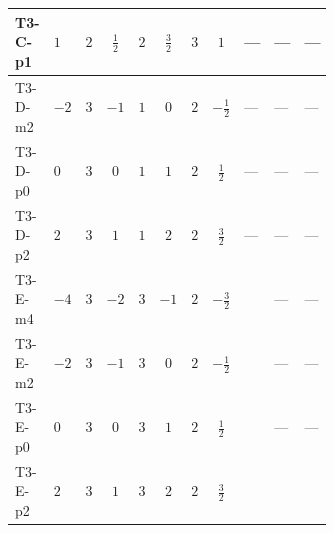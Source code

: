 \documentclass[8pt]{article}
\begin{document}
\begin{landscape}
\begin{longtable}{@{}llcccccc >{\raggedright\arraybackslash}p{0.21\linewidth} >{\raggedright\arraybackslash}p{0.21\linewidth} >{\raggedright\arraybackslash}p{0.21\linewidth}@{}}
\midrule
T3-C-p1 & $1$ & $2$ & $\frac{1}{2}$ & $2$ & $\frac{3}{2}$ & $3$ & $1$ & --- & --- & --- \\
\midrule
T3-D-m2 & $-2$ & $3$ & $-1$ & $1$ & $0$ & $2$ & $-\frac{1}{2}$ & --- & --- & --- \\
\midrule
T3-D-p0 & $0$ & $3$ & $0$ & $1$ & $1$ & $2$ & $\frac{1}{2}$ & --- & --- & --- \\
\midrule
T3-D-p2 & $2$ & $3$ & $1$ & $1$ & $2$ & $2$ & $\frac{3}{2}$ & --- & --- & --- \\
\midrule
T3-E-m4 & $-4$ & $3$ & $-2$ & $3$ & $-1$ & $2$ & $-\frac{3}{2}$ & \scriptsize\adjustbox{max width=\linewidth}{$\begin{gathered} -\frac{{\lambda_{12}^{(\times)}}^2}{2}\end{gathered}$} & --- & --- \\
\midrule
T3-E-m2 & $-2$ & $3$ & $-1$ & $3$ & $0$ & $2$ & $-\frac{1}{2}$ & \scriptsize\adjustbox{max width=\linewidth}{$\begin{gathered} -\frac{{\lambda_{12}^{(\times)}}^2}{2}\end{gathered}$} & --- & --- \\
\midrule
T3-E-p0 & $0$ & $3$ & $0$ & $3$ & $1$ & $2$ & $\frac{1}{2}$ & \scriptsize\adjustbox{max width=\linewidth}{$\begin{gathered} -\frac{{\lambda_{12}^{(\times)}}^2}{2}\end{gathered}$} & --- & --- \\
\midrule
T3-E-p2 & $2$ & $3$ & $1$ & $3$ & $2$ & $2$ & $\frac{3}{2}$ & \scriptsize\adjustbox{max width=\linewidth}{$\begin{gathered} -\frac{{\lambda_{12}^{(\times)}}^2}{2}\end{gathered}$} & \scriptsize\adjustbox{max width=\linewidth}{$\begin{gathered} +{g_1}^2 \left(36 {g_2}^2-6 {\lambda_{S_2}^{(1)}}-48 {\lambda_{S_2}^{(A)}}\right)\end{gathered}$} & \scriptsize\adjustbox{max width=\linewidth}{$\begin{gathered} +24 {g_1}^4\end{gathered}$} \\
\midrule
\bottomrule
\end{longtable}
\end{landscape}
\end{document}
